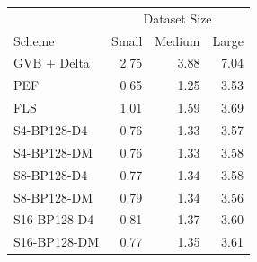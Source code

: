 \begin{tabular}{lrrr}
\toprule
 & \multicolumn{3}{c}{Dataset Size} \\
Scheme & Small & Medium & Large \\
\midrule
GVB + Delta & 2.75 & 3.88 & 7.04 \\
PEF & 0.65 & 1.25 & 3.53 \\
FLS & 1.01 & 1.59 & 3.69 \\
S4-BP128-D4 & 0.76 & 1.33 & 3.57 \\
S4-BP128-DM & 0.76 & 1.33 & 3.58 \\
S8-BP128-D4 & 0.77 & 1.34 & 3.58 \\
S8-BP128-DM & 0.79 & 1.34 & 3.56 \\
S16-BP128-D4 & 0.81 & 1.37 & 3.60 \\
S16-BP128-DM & 0.77 & 1.35 & 3.61 \\
\bottomrule
\end{tabular}
